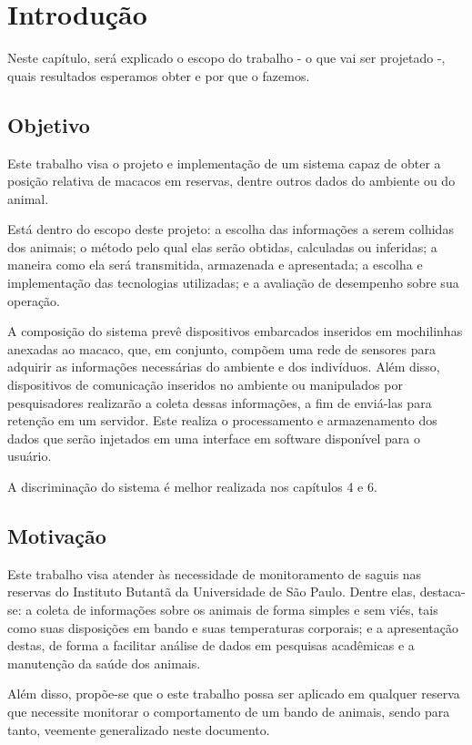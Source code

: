 \chapter{Introdução}
Neste capítulo, será explicado o escopo do trabalho - o que vai ser projetado -, quais resultados esperamos obter e por que o fazemos.
	
\section{Objetivo}
Este trabalho visa o projeto e implementação de um sistema capaz de obter a posição relativa de macacos em reservas, dentre outros dados do ambiente ou do animal.

Está dentro do escopo deste projeto: a escolha das informações a serem colhidas dos animais; o método pelo qual elas serão obtidas, calculadas ou inferidas; a maneira como ela será transmitida, armazenada e apresentada; a escolha e implementação das tecnologias utilizadas; e a avaliação de desempenho sobre sua operação.

A composição do sistema prevê dispositivos embarcados inseridos em mochilinhas anexadas ao macaco, que, em conjunto, compõem uma rede de sensores para adquirir as informações necessárias do ambiente e dos indivíduos. Além disso, dispositivos de comunicação inseridos no ambiente ou manipulados por pesquisadores realizarão a coleta dessas informações, a fim de enviá-las para retenção em um servidor.  Este realiza o processamento e armazenamento dos dados que serão injetados em uma interface em software disponível para o usuário.

A discriminação do sistema é melhor realizada nos capítulos 4 e 6.

\section{Motivação}
Este trabalho visa atender às necessidade de monitoramento de saguis nas reservas do Instituto Butantã da Universidade de São Paulo. Dentre elas, destaca-se: a coleta de informações sobre os animais de forma simples e sem viés, tais como suas disposições em bando e suas temperaturas corporais; e a apresentação destas, de forma a facilitar análise de dados em  pesquisas acadêmicas e a manutenção da saúde dos animais.

Além disso, propõe-se que o este trabalho possa ser aplicado em qualquer reserva que necessite monitorar o comportamento de um bando de animais, sendo para tanto, veemente generalizado neste documento.

